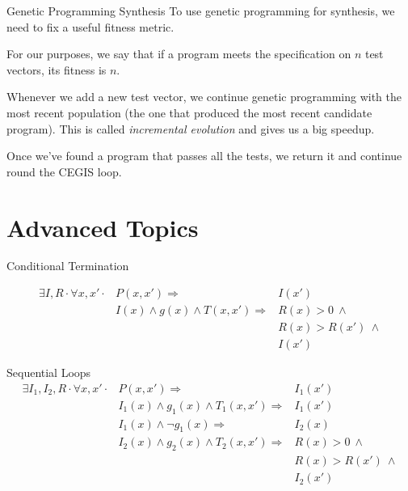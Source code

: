 \documentclass[xcolor=pdftex,t,11pt]{beamer}
\begin{document}
\begin{frame}{Genetic Programming Synthesis}
To use genetic programming for synthesis, we need to fix a useful fitness metric.

\vspace{1em}

For our purposes, we say that if a program meets the specification on $n$ test vectors, its
fitness is $n$.

Whenever we add a new test vector, we continue genetic programming with the most recent population
(the one that produced the most recent candidate program).  This is called \emph{incremental evolution}
and gives us a big speedup.

\vspace{1em}

Once we've found a program that passes all the tests, we return it and continue round the CEGIS
loop.
\end{frame}

\section{Advanced Topics}
\begin{frame}{Conditional Termination}

\begin{align*}
\exists I, R \cdot \forall x, x' \cdot & P(x, x') \Rightarrow & I(x') \\
                                       & I(x) \wedge g(x) \wedge T(x, x') \Rightarrow & R(x) > 0 ~ \wedge \\
                                       & & R(x) > R(x') ~ \wedge \\
                                       & & I(x')
\end{align*}
\end{frame}

\begin{frame}{Sequential Loops}
\begin{align*}
\exists I_1, I_2, R \cdot \forall x, x' \cdot & P(x, x') \Rightarrow & I_1(x') \\
                                              & I_1(x) \wedge g_1(x) \wedge T_1(x, x') \Rightarrow & I_1(x') \\
                                              & I_1(x) \wedge \lnot g_1(x) \Rightarrow & I_2(x) \\
					      & I_2(x) \wedge g_2(x) \wedge T_2(x, x') \Rightarrow & R(x) > 0 ~ \wedge \\
					      & & R(x) > R(x') ~ \wedge \\
					      & & I_2(x')
\end{align*}
\end{frame}
\end{document}
